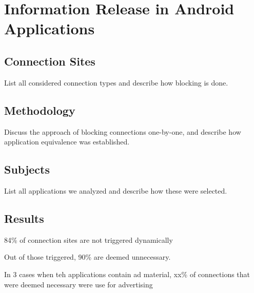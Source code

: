 \section{Information Release in Android Applications}
\label{sec:study} 

\subsection{Connection Sites}
List all considered connection types and describe how blocking is done. 

\subsection{Methodology}
Discuss the approach of blocking connections one-by-one, and describe how application equivalence was established. 

\subsection{Subjects}
List all applications we analyzed and describe how these were selected.
 
\subsection{Results}
84\% of connection sites are not triggered dynamically

Out of those triggered, 90\% are deemed unnecessary.

In 3 cases when teh applications contain ad material, xx\% of connections that were deemed  necessary were use for advertising 

